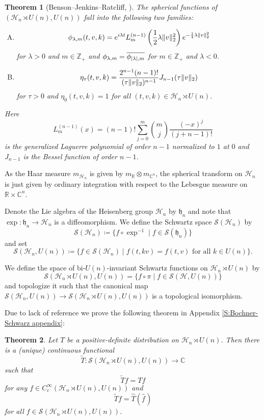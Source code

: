 \documentclass[12pt,reqno,a4paper]{amsart}
\theoremstyle{theorem}
\newtheorem{theorem}{Theorem}[section]
\theoremstyle{definition}
\numberwithin{theorem}{section}
\numberwithin{equation}{section}
\newcommand{\R}{\mathbb{R}}
\newcommand{\Z}{\mathbb{Z}}
\newcommand{\C}{\mathbb{C}}
\DeclarePairedDelimiter{\norm}{\lVert}{\rVert}
\DeclarePairedDelimiter{\abs}{\lvert}{\rvert}
\begin{document}
\begin{theorem}[Benson--Jenkins--Ratcliff, \cite{BensonJenkinsRatcliff}]\label{t:parametrization_spherical_heisenberg}
	The spherical functions of $(\mathcal{H}_n\rtimes U(n), U(n))$ fall into the following two families:
	\begin{enumerate}[(A)]
		\item \[\phi_{\lambda, m}(t, v, k) = e^{i\lambda t}L_m^{(n-1)}\left (\frac{1}{2}\lambda\norm{v}_2^2\right )e^{-\frac{1}{4}\lambda\norm{v}_2^2}\] for $\lambda>0$ and $m\in \Z_+$ and 
		$\phi_{\lambda, m} = \overline{\phi_{\abs{\lambda}, m}}$ for $m\in \Z_+$ and $\lambda < 0$.
		\item \[\eta_\tau(t, v, k) = \frac{2^{n-1}(n-1)!}{(\tau\norm{v}_2)^{n-1}}J_{n-1}(\tau\norm{v}_2)\] for $\tau>0$ and $\eta_0(t,v,k)=1$ for all $(t,v,k)\in \mathcal{H}_n\rtimes U(n)$.
	\end{enumerate}
	Here 
	\[
	L_m^{(n-1)}(x) = (n-1)!\sum_{j=0}^m\binom{m}{j}\frac{(-x)^j}{(j+n-1)!}
	\]
	is the generalized Laguerre polynomial of order $n-1$ normalized to $1$ at $0$ and $J_{n-1}$ is the Bessel function of order $n-1$.
\end{theorem}
As the Haar measure $m_{\mathcal{H}_n}$ is given by $m_{\R}\otimes m_{\C^n}$, the spherical transform on $\mathcal{H}_n$ is just given by ordinary integration with respect to the Lebesgue measure on $\R\times \C^n$.

Denote the Lie algebra of the Heisenberg group $\mathcal{H}_n$ by $\mathfrak{h}_n$ and note that $\exp:\mathfrak{h}_n\to \mathcal{H}_n$ is a diffeomorphism. We define the Schwartz space $\mathscr{S}(\mathcal{H}_n)$ by 
\[\mathscr{S}(\mathcal{H}_n)\coloneqq \{f\circ \exp^{-1}\mid f\in \mathscr{S}(\mathfrak{h}_n)\}\]
and set
\[\mathscr{S}(\mathcal{H}_n, U(n))\coloneqq \{f\in \mathscr{S}(\mathcal{H}_n)\mid f(t,kv) = f(t,v)\text{ for all $k\in U(n)$}\}.\]

We define the space of bi-$U(n)$-invariant Schwartz functions on $\mathcal{H}_n\rtimes U(n)$ by
\[\mathscr{S}(\mathcal{H}_n\rtimes U(n), U(n)) = \{f\circ \pi\mid f\in \mathscr{S}(\mathcal{H}, U(n))\}\]
and topologize it such that the canonical map $\mathscr{S}(\mathcal{H}_n, U(n))\to \mathscr{S}(\mathcal{H}_n\rtimes U(n), U(n))$ is a topological isomorphism.

Due to lack of reference we prove the following theorem in Appendix \ref{S:Bochner-Schwarz appendix}:
\begin{theorem}\label{t:heisenberg_bochner_schwartz}
	Let $T$ be a positive-definite distribution on $\mathcal{H}_n\rtimes U(n)$. Then there is a (unique) continuous functional
	\[\tilde{T}:\mathscr{S}(\mathcal{H}_n\rtimes U(n), U(n))\to \C\]
	such that 
	\[\tilde{T}f = Tf\]
	for any $f\in C^\infty_c(\mathcal{H}_n\rtimes U(n),U(n))$
	and 
	\[\tilde{T}f = \widehat{T}(\widehat{f}\hspace{1pt})\]
	for all $f\in \mathscr{S}(\mathcal{H}_n\rtimes U(n), U(n))$.
\end{theorem}
\end{document}
